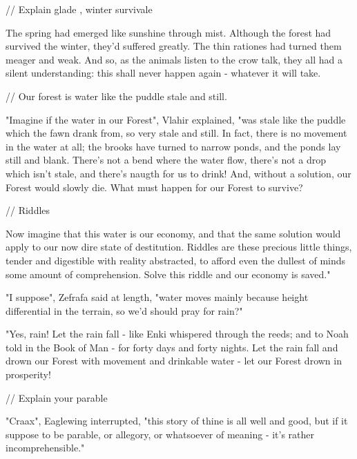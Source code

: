 // Explain glade , winter survivale

The spring had emerged like sunshine through mist. Although the forest had survived the winter, they'd suffered greatly. The thin rationes had turned them meager and weak. And so, as the animals listen to the crow talk, they all had a silent understanding: this shall never happen again - whatever it will take.

// Our forest is water like the puddle stale and still.

"Imagine if the water in our Forest", Vlahir explained, "was stale like the puddle which the fawn drank from, so very stale and still. In fact, there is no movement in the water at all; the brooks have turned to narrow ponds, and the ponds lay still and blank. There's not a bend where the water flow, there's not a drop which isn't stale, and there's naugth for us to drink! And, without a solution, our Forest would slowly die. What must happen for our Forest to survive?

// Riddles


Now imagine that this water is our economy, and that the same solution would apply to our now dire state of destitution.
Riddles are these precious little things, tender and digestible with reality abstracted, to afford even the dullest of minds some amount of comprehension. Solve this riddle and our economy is saved."

"I suppose", Zefrafa said at length, "water moves mainly because height differential in the terrain, so we'd should pray for rain?"

"Yes, rain! Let the rain fall - like Enki whispered through the reeds; and to Noah told in the Book of Man - for forty days and forty nights. Let the rain fall and drown our Forest with movement and drinkable water - let our Forest drown in prosperity!

// Explain your parable 

"Craax", Eaglewing interrupted, "this story of thine is all well and good, but if it suppose to be parable, or allegory, or whatsoever of meaning - it's rather incomprehensible."

